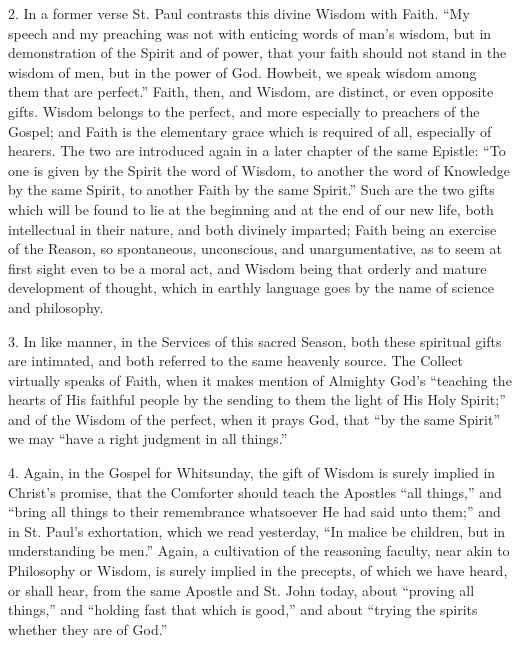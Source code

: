 2. In a former verse St. Paul contrasts this divine Wisdom with
Faith. ``My speech and my preaching was not with enticing words of
man's wisdom, but in demonstration of the Spirit and of power, that
your faith should not stand in the wisdom of men, but in the power of
God. Howbeit, we speak wisdom among them that are perfect.''
Faith, then, and Wisdom, are distinct, or even opposite gifts. Wisdom
belongs to the perfect, and more especially to preachers of the
Gospel; and Faith is the elementary grace which is required of all,
especially of hearers. The two are introduced again in a later chapter
of the same Epistle: ``To one is given by the Spirit the word of
Wisdom, to another the word of Knowledge by the same Spirit, to
another Faith by the same Spirit.'' Such are the two gifts which
will be found to lie at the beginning and at the end of our new life,
both intellectual in their nature, and both divinely imparted; Faith
being an exercise of the Reason, so spontaneous, unconscious, and
unargumentative, as to seem at first sight even to be a moral act, and
Wisdom being that orderly and mature development of thought, which in
earthly language goes by the name of science and philosophy.

3. In like manner, in the Services of this sacred Season, both
these spiritual gifts are intimated, and both referred to the same
heavenly source. The Collect virtually speaks of Faith, when it makes
mention of Almighty God's ``teaching the hearts of His faithful
people by the sending to them the light of His Holy Spirit;'' and
of the Wisdom of the perfect, when it prays God, that ``by the
same Spirit'' we may ``have a right judgment in all
things.''

4. Again, in the Gospel for Whitsunday, the gift of Wisdom is
surely implied in Christ's promise, that the Comforter should teach
the Apostles ``all things,'' and ``bring all things to
their remembrance whatsoever He had said unto them;'' and in St.
Paul's exhortation, which we read yesterday, ``In malice be
children, but in understanding be men.'' Again, a cultivation of
the reasoning faculty, near akin to Philosophy or Wisdom, is surely
implied in the precepts, of which we have heard, or shall hear, from
the same Apostle and St. John today, about ``proving all
things,'' and ``holding fast that which is good,'' and
about ``trying the spirits whether they are of God.''

